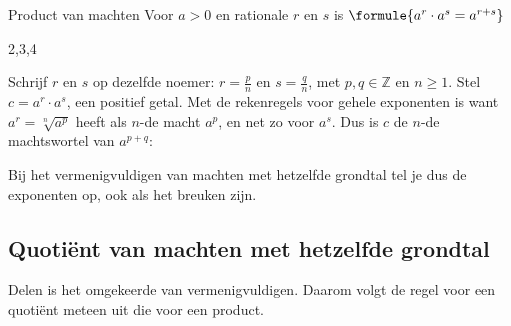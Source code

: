 \begin{theorie}
\begin{stelling}{Product van machten}
Voor $a > 0$ en rationale $r$ en $s$ is \qquad $\formule{a^r \cdot a^s = a^{r + s}}$
\end{stelling}
\begin{alleenvoor}{2,3,4}
\begin{bewijs}
Schrijf $r$ en $s$ op dezelfde noemer: $r = \frac{p}{n}$ en $s = \frac{q}{n}$, met $p, q \in \mathbb{Z}$ en $n \geqslant 1$. Stel $c = a^r \cdot a^s$, een positief getal. Met de rekenregels voor gehele exponenten is
want $a^r = \sqrt[n]{a^p}$ heeft als $n$-de macht $a^p$, en net zo voor $a^s$. Dus is $c$ de $n$-de machtswortel van $a^{p+q}$:
\end{bewijs}
\end{alleenvoor}
\end{theorie}

Bij het vermenigvuldigen van machten met hetzelfde grondtal tel je dus de exponenten op, ook als het breuken zijn.


\begin{oefeningen}
\end{oefeningen}

\subsection{Quotiënt van machten met hetzelfde grondtal}

Delen is het omgekeerde van vermenigvuldigen. Daarom volgt de regel voor een quotiënt meteen uit die voor een product.


